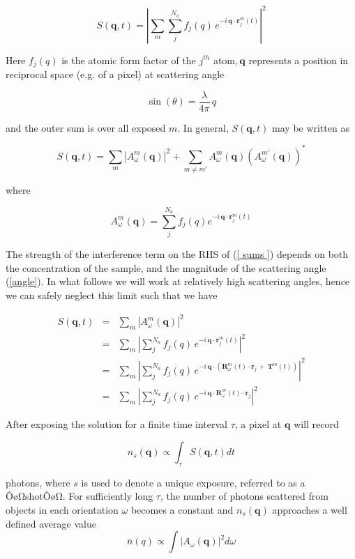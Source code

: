 \documentclass [11pt,fleqn]{article}
\def \be {\begin{equation}}
\def \ee {\end{equation}}
\def \beq {\begin{eqnarray}}
\def \eeq {\end{eqnarray}}
\begin{document}
\be
S(\bm q, t) = \left | \sum_m \sum_{j}^{N_a} f_j(q) \,e ^ { -i \,\bm q \cdot \bm  r^m _j (t)  } \right |^2
\ee

Here $f_j( q  )$ is the atomic form factor of the $j^{th}$ atom$, \bm q$ represents a position in reciprocal space (e.g. of a pixel) at scattering angle  

\be \label{angle}
\sin(\theta) = \frac{ \lambda }{ 4 \pi}\,q
\ee

and the outer sum is over all exposed $m$. In general, $S(\bm q, t)$ may be written as

\be \label{ sums }
S( \bm q, t) = \sum_m \left | A^m_\omega (\bm q ) \right|^2 + \sum _{ m \neq m' } A^m_\omega (\bm q) \left (A^{m'}_\omega (\bm q) \right )^*
\ee

where 

\be
A^m_\omega (\bm q) = \sum_{j}^{N_a} f_j(q) e^{ -i \,\bm q \cdot \bm  r^m_j (t)  }
\ee

The strength of the interference term on the RHS of (\ref{ sums }) depends on both the concentration of the sample, and the magnitude of the scattering angle (\ref{angle}). In what follows we will work at relatively high scattering angles, hence we can safely neglect this limit such that we have

\beq \label{ scatter}
S( \bm q, t) &=& \sum_m \left | A^m_\omega (\bm q) \right|^2 \\
&=& \sum_m \left | \sum_{j}^{N_a} f_j(q)\, e^ { -i \,\bm q \cdot \bm  r^m _j (t)} \right | ^2   \\
&=& \sum_m \left | \sum_{j}^{N_a} f_j(q)\, e^ { -i \,\bm q \cdot \left (\bm {R}^m_\omega \left(t\right)\cdot \bm r_j \,+\, \bm {T}^m\left(t\right) \right)} \right | ^2 \\
&=& \sum_m \left | \sum_{j}^{N_a} f_j(q)\, e^ { -i \,\bm q \cdot \bm {R}^m_\omega (t)\cdot \bm r_j }  \right | ^2 
\eeq

After exposing the solution for a finite time interval $\tau$, a pixel at $\bm q$ will record 

\be
n_s( \bm q ) \propto \int_{\tau} S( \bm q, t ) dt
\ee

photons, where $s$ is used to denote a unique exposure, referred to as a ÔøΩshotÔøΩ. For sufficiently long $\tau$, the number of photons scattered from objects in each orientation $\omega$ becomes a constant and $n_s(\bm q)$ approaches a well defined average value
\be 
\bar n(q) \propto \int \left | A_\omega (\bm q) \right | ^2 d\omega
\ee
\end{document}
